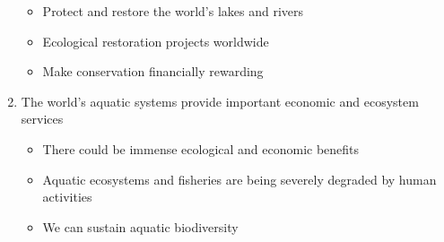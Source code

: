 \documentclass[12pt]{article}
\begin{document}
\begin{enumerate}
\begin{itemize}
      \item Protect and restore the world's lakes and rivers

      \item Ecological restoration projects worldwide

      \item Make conservation financially rewarding

    \end{itemize}

  \item The world's aquatic systems provide important economic and ecosystem services

    \begin{itemize}

      \item There could be immense ecological and economic benefits

      \item Aquatic ecosystems and fisheries are being severely degraded by human activities

      \item We can sustain aquatic biodiversity

    \end{itemize}
    
\end{enumerate}
\end{document}
